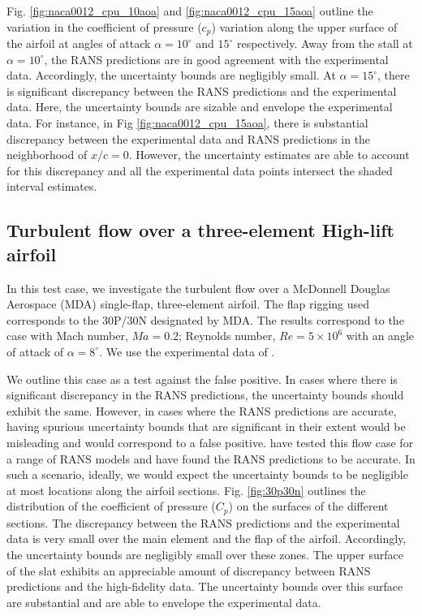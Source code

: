 Fig. \ref{fig:naca0012_cpu_10aoa} and \ref{fig:naca0012_cpu_15aoa} outline the variation in the coefficient of pressure ($c_p$) variation along the upper surface of the airfoil at angles of attack $\alpha=10^{\circ}$ and $15^{\circ}$ respectively. Away from the stall at $\alpha=10^{\circ}$, the RANS predictions are in good agreement with the experimental data. Accordingly, the uncertainty bounds are negligibly small. At $\alpha=15^{\circ}$, there is significant discrepancy between the RANS predictions and the experimental data. Here, the uncertainty bounds are sizable and envelope the experimental data. For instance, in Fig \ref{fig:naca0012_cpu_15aoa}, there is substantial discrepancy between the experimental data and RANS predictions in the neighborhood of $x/c=0$. However, the uncertainty estimates are able to account for this discrepancy and all the experimental data points intersect the shaded interval estimates.

\subsection{Turbulent flow over a three-element High-lift airfoil}

In this test case, we investigate the turbulent flow over a McDonnell Douglas Aerospace (MDA) single-flap, three-element airfoil. The flap rigging used corresponds to the 30P/30N designated by MDA. The results correspond to the case with Mach number, $Ma=0.2$; Reynolds number, $Re=5 \times 10^6$ with an angle of attack of $\alpha=8^{\circ}$. We use the experimental data of \cite{chin1993}. 

We outline this case as a test against the false positive. In cases where there is significant discrepancy in the RANS predictions, the uncertainty bounds should exhibit the same. However, in cases where the RANS predictions are accurate, having spurious uncertainty bounds that are significant in their extent would be misleading and would correspond to a false positive. \cite{klausmeyer1997} have tested this flow case for a range of RANS models and have found the RANS predictions to be accurate. In such a scenario, ideally, we would expect the uncertainty bounds to be negligible at most locations along the airfoil sections. Fig. \ref{fig:30p30n} outlines the distribution of the coefficient of pressure ($C_p$) on the surfaces of the different sections. The discrepancy between the RANS predictions and the experimental data is very small over the main element and the flap of the airfoil. Accordingly, the uncertainty bounds are negligibly small over these zones. The upper surface of the slat exhibits an appreciable amount of discrepancy between RANS predictions and the high-fidelity data. The uncertainty bounds over this surface are substantial and are able to envelope the experimental data.   



